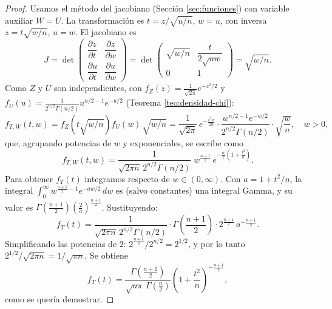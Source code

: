 \documentclass[11pt,a4paper]{article}
\theoremstyle{plain}
\theoremstyle{definition}
\theoremstyle{remark}
\begin{document}
\begin{proof}
Usamos el método del jacobiano (Sección \ref{sec:funciones}) con variable auxiliar $W=U$. La transformación es $t=z/\sqrt{u/n}$, $w=u$, con inversa $z=t\sqrt{w/n}$, $u=w$. El jacobiano es
\[
J = \det\begin{pmatrix}\dfrac{\partial z}{\partial t} & \dfrac{\partial z}{\partial w} \\[2mm] \dfrac{\partial u}{\partial t} & \dfrac{\partial u}{\partial w}\end{pmatrix} = \det\begin{pmatrix} \sqrt{w/n} & \dfrac{t}{2\sqrt{nw}} \\[2mm] 0 & 1\end{pmatrix} = \sqrt{w/n}.
\]
Como $Z$ y $U$ son independientes, con $f_Z(z)=\tfrac{1}{\sqrt{2\pi}}e^{-z^2/2}$ y $f_U(u) = \tfrac{1}{2^{n/2}\Gamma(n/2)}u^{n/2-1}e^{-u/2}$ (Teorema \ref{teo:densidad-chi}):
\[
f_{T,W}(t,w) = f_Z\!\left(t\sqrt{w/n}\right) f_U(w)\,\sqrt{w/n} = \frac{1}{\sqrt{2\pi}}\,e^{-\frac{t^2w}{2n}}\cdot\frac{w^{n/2-1}e^{-w/2}}{2^{n/2}\Gamma(n/2)}\cdot\sqrt{\frac{w}{n}}, \quad w>0,
\]
que, agrupando potencias de $w$ y exponenciales, se escribe como
\[
f_{T,W}(t,w) = \frac{1}{\sqrt{2\pi n}\,2^{n/2}\Gamma(n/2)}\; w^{\frac{n-1}{2}}\, e^{-\frac{w}{2}\left(1+\frac{t^2}{n}\right)}.
\]
Para obtener $f_T(t)$ integramos respecto de $w\in(0,\infty)$. Con $a=1+t^2/n$, la integral $\int_0^\infty w^{\frac{n+1}{2}-1}e^{-aw/2}\,dw$ es (salvo constantes) una integral Gamma, y su valor es $\Gamma\!\left(\frac{n+1}{2}\right)\left(\frac2a\right)^{\frac{n+1}{2}}$. Sustituyendo:
\[
f_T(t) = \frac{1}{\sqrt{2\pi n}\,2^{n/2}\Gamma(n/2)}\cdot\Gamma\!\left(\frac{n+1}{2}\right)\cdot 2^{\frac{n+1}{2}}\, a^{-\frac{n+1}{2}}.
\]
Simplificando las potencias de $2$: $2^{\frac{n+1}{2}}/2^{n/2} = 2^{1/2}$, y por lo tanto $2^{1/2}/\sqrt{2\pi n} = 1/\sqrt{\pi n}$. Se obtiene
\[
f_T(t) = \frac{\Gamma\!\left(\frac{n+1}{2}\right)}{\sqrt{n\pi}\,\Gamma\!\left(\frac n2\right)}\left(1+\frac{t^2}{n}\right)^{-\frac{n+1}{2}},
\]
como se quería demostrar.
\end{proof}
\end{document}
